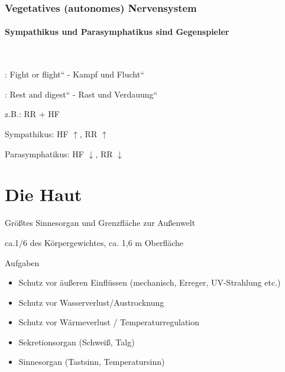 \subsubsection{Vegetatives (autonomes)  Nervensystem}
\paragraph{Sympathikus  und Parasymphatikus  sind 
Gegenspieler}~

: {\quotedblbase}Fight or
flight{\textquotedblleft} - {\quotedblbase}Kampf und Flucht{\textquotedblleft}

: {\quotedblbase}Rest and
digest{\textquotedblleft} - {\quotedblbase}Rast und Verdauung{\textquotedblleft}

z.B.: RR + HF

Sympathikus:  HF ${\uparrow}$, RR ${\uparrow}$

Parasymphatikus: HF ${\downarrow}$, RR ${\downarrow}$

 



\section{Die Haut}


Gr\"o{\ss}tes Sinnesorgan und Grenzfl\"ache zur
Au{\ss}enwelt

ca.1/6 des K\"orpergewichtes, ca. 1,6 m{\texttwosuperior} Oberfl\"ache



Aufgaben

\begin{itemize}
\item Schutz vor \"au{\ss}eren Einfl\"ussen (mechanisch, Erreger,
UV-Strahlung etc.)
\item Schutz vor Wasserverlust/Austrocknung
\item Schutz vor W\"armeverlust /  Temperaturregulation
\item Sekretionsorgan (Schwei{\ss}, Talg)
\item Sinnesorgan (Tastsinn, Temperatursinn)
\end{itemize}

